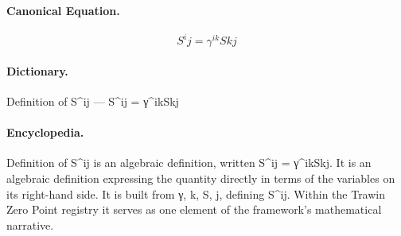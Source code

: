 \paragraph{Canonical Equation.}
\[
S^i{}j = \gamma^{ik}S{kj}
\]

\paragraph{Dictionary.}
Definition of S\textasciicircum{}ij — S\textasciicircum{}ij = γ\textasciicircum{}ikSkj

\paragraph{Encyclopedia.}
Definition of S\textasciicircum{}ij is an algebraic definition, written S\textasciicircum{}ij = γ\textasciicircum{}ikSkj. It is an algebraic definition expressing the quantity directly in terms of the variables on its right-hand side. It is built from γ, k, S, j, defining S\textasciicircum{}ij. Within the Trawin Zero Point registry it serves as one element of the framework's mathematical narrative.
